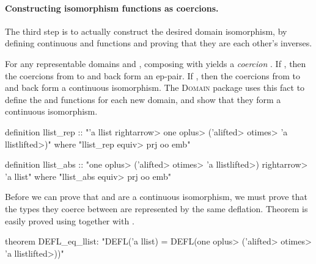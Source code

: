 \paragraph{Constructing isomorphism functions as coercions.}

The third step is to actually construct the desired domain isomorphism, by defining continuous  and  functions and proving that they are each other's inverses.

For any representable domains  and , composing  with  yields a \emph{coercion} . If , then the coercions from  to  and back form an ep-pair. If , then the coercions from  to  and back form a continuous isomorphism. The \textsc{Domain} package uses this fact to define the  and  functions for each new domain, and show that they form a continuous isomorphism.

\begin{isacode}
definition llist_rep :: "'a llist \<rightarrow> one \<oplus> ('a\<lifted> \<otimes> 'a llist\<lifted>)"
  where "llist_rep \<equiv> prj oo emb"
\end{isacode}
\unmedskip
{}
\begin{isacode}
definition llist_abs :: "one \<oplus> ('a\<lifted> \<otimes> 'a llist\<lifted>) \<rightarrow> 'a llist"
  where "llist_abs \<equiv> prj oo emb"
\end{isacode}

Before we can prove that  and  are a continuous isomorphism, we must prove that the types they coerce between are represented by the same deflation. Theorem  is easily proved using  together with .
%
\begin{isacode}
theorem DEFL_eq_llist: "DEFL('a llist) = DEFL(one \<oplus> ('a\<lifted> \<otimes> 'a llist\<lifted>))"
\end{isacode}

